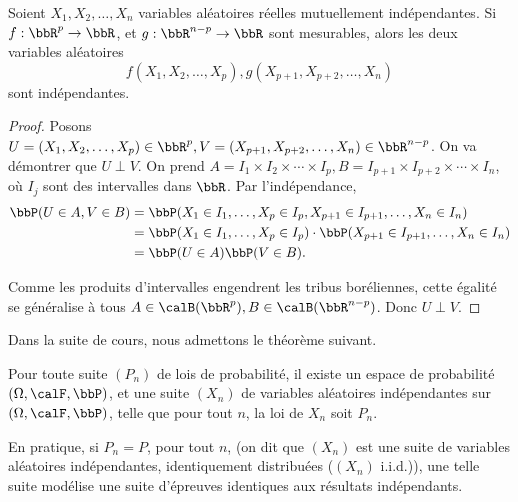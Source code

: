\begin{prop}
    Soient $X_1, X_2, \ldots, X_n$ variables aléatoires réelles mutuellement indépendantes.
    Si $f: \bbR^p \to \bbR$, et $g: \bbR^{n - p} \to \bbR$ sont mesurables,
    alors les deux variables aléatoires
    \[ f(X_1, X_2, \ldots, X_p), g(X_{p + 1}, X_{p + 2}, \ldots, X_n) \]
    sont indépendantes.
\end{prop}

\begin{proof}
    Posons $U = (X_1, X_2, \ldots, X_p) \in \bbR^p, V = (X_{p + 1}, X_{p + 2}, \ldots, X_n) \in \bbR^{n - p}$.
    On va démontrer que $U \perp V$.
    On prend $A = I_1 \times I_2 \times \cdots \times I_p, B = I_{p + 1} \times I_{p + 2} \times \cdots \times I_n$,
    où $I_j$ sont des intervalles dans $\bbR$.
    Par l'indépendance,
    \begin{align*}
        \bbP(U \in A, V \in B) & = \bbP(X_1 \in I_1, \ldots, X_p \in I_p, X_{p + 1} \in I_{p + 1}, \ldots, X_n \in I_n)            \\
                               & = \bbP(X_1 \in I_1, \ldots, X_p \in I_p) \cdot \bbP(X_{p + 1} \in I_{p + 1}, \ldots, X_n \in I_n) \\
                               & = \bbP(U \in A) \bbP(V \in B).
    \end{align*}

    Comme les produits d'intervalles engendrent les tribus boréliennes,
    cette égalité se généralise à tous $A \in \calB(\bbR^p), B \in \calB(\bbR^{n - p})$.
    Donc $U \perp V$.
\end{proof}

Dans la suite de cours, nous admettons le théorème suivant.
\begin{thm}
    Pour toute suite $(P_n)$ de lois de probabilité,
    il existe un espace de probabilité $(\Omega, \calF, \bbP)$,
    et une suite $(X_n)$ de variables aléatoires indépendantes sur $(\Omega, \calF, \bbP)$,
    telle que pour tout $n$, la loi de $X_n$ soit $P_n$.
\end{thm}

\begin{rqq}
    En pratique, si $P_n = P$, pour tout $n$,
    (on dit que $(X_n)$ est une suite de variables aléatoires
    indépendantes, identiquement distribuées ($(X_n)$ i.i.d.)),
    une telle suite modélise une suite d'épreuves identiques aux résultats indépendants.
\end{rqq}

